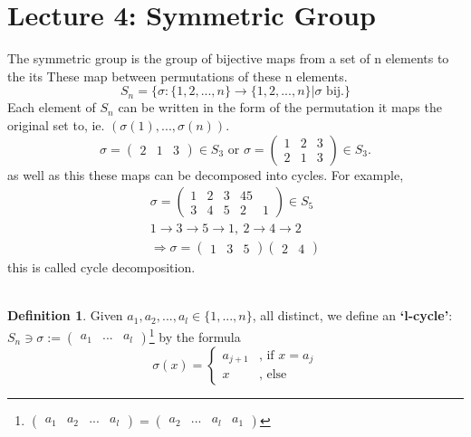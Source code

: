 \documentclass{article}
\theoremstyle{definition}
\newtheorem{definition}{Definition}[section]
\theoremstyle{remark}
\begin{document}
\section{Lecture 4: Symmetric Group}
The symmetric group is the group of bijective maps from a set of n elements to the its These map between permutations of these n elements.
\begin{equation}
	\label{eq: SymmetricGroup}
	S_n=\lbrace \sigma:\lbrace 1,2,...,n\rbrace\rightarrow\lbrace1,2,...,n\rbrace|\sigma \text{ bij}.\rbrace
\end{equation}
Each element of $S_n$ can be written in the form of the permutation it maps the original set to, ie. $\left(\sigma(1),...,\sigma(n)\right)$. \\
\begin{equation}
	\sigma = \begin{pmatrix}
		2 & 1 & 3
	\end{pmatrix} \in S_3
	\text{ or } \sigma =\begin{pmatrix}
		1 & 2 & 3 \\ 2&1&3
	\end{pmatrix}\in S_3.
\end{equation}
as well as this these maps can be decomposed into cycles. For example,
\begin{align*}
	\sigma=\begin{pmatrix}
		       1 & 2 & 3 & 45 \\ 3&4&5&2&1
	       \end{pmatrix}\in S_5                                        \\
	1\rightarrow 3 \rightarrow 5 \rightarrow 1,~2\rightarrow 4 \rightarrow 2 \\
	\Rightarrow \sigma = \begin{pmatrix}
		                     1 & 3 & 5
	                     \end{pmatrix}\begin{pmatrix}
		                                  2 & 4
	                                  \end{pmatrix}
\end{align*}
this is called cycle decomposition.\\
\vspace{2mm}~\\
\begin{definition}
	Given $a_1,a_2,...,a_l\in \lbrace 1,...,n\rbrace$, all distinct, we define an \textbf{`l-cycle'}: $S_n\ni\sigma:=\begin{pmatrix}
			a_1 & ... & a_l
		\end{pmatrix}$\footnote{$\begin{pmatrix}
				a_1 & a_2 & ... & a_l
			\end{pmatrix}=\begin{pmatrix}
				a_2 & ... & a_l & a_1
			\end{pmatrix}$}
	by the formula
	\begin{equation}
		\sigma(x)=
		\begin{cases}
			a_{j+1} & \text{, if }x=a_j \\
			x       & \text{, else}
		\end{cases}
	\end{equation}
\end{definition}
\end{document}
